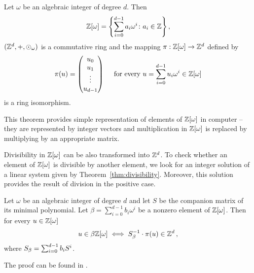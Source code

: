 \begin{thm}
\label{thm:isomorphismWithZd}
Let  $\omega$ be an algebraic integer of degree $d$. Then 
$$
\mathbb{Z}[\omega] =\left\{\sum_{i=0}^{d-1} a_i \omega^i \colon a_i\in\mathbb{Z} \right\},
$$ 
$(\mathbb{Z}^d,+,\odot_\omega)$ is a commutative ring and the mapping $\pi:\mathbb{Z}[\omega] \rightarrow \mathbb{Z}^{d}$ defined by 
$$
\pi(u)=\begin{pmatrix} {u}_0 \\ {u}_1 \\ \vdots \\ {u}_{d-1} \end{pmatrix} \quad \text{ for every } u=\sum_{i=0}^{d-1} u_i \omega^i \in \mathbb{Z}[\omega]
$$
is a ring isomorphism.
\end{thm}

This theorem provides simple representation of elements of $\mathbb{Z}[\omega]$ in computer -- they are represented by integer vectors and multiplication in $\mathbb{Z}[\omega]$ is replaced by multiplying by an appropriate matrix. 

Divisibility in $\mathbb{Z}[\omega]$ can be also transformed into $\mathbb{Z}^d$. To check whether an element of $\mathbb{Z}[\omega]$ is divisible by another element, we look for an integer solution of a linear system given by Theorem~\ref{thm:divisibility}. Moreover, this solution provides the result of  division in the positive case. 
\begin{thm}
\label{thm:divisibility}
Let $\omega$ be an algebraic integer of degree $d$ and let $S$ be the companion matrix of its minimal polynomial. Let $\beta=\sum_{i=0}^{d-1} b_i \omega^i$ be a nonzero element of $\mathbb{Z}[\omega]$. Then for every $u\in\mathbb{Z}[\omega]$
$$
u\in\beta\mathbb{Z}[\omega] \iff S_\beta^{-1}\cdot \pi(u) \in \mathbb{Z}^d\,,
$$
where $S_\beta=\sum_{i=0}^{d-1} {b}_i S^i$.
\end{thm}
The proof can be found in \cite{vu}.
